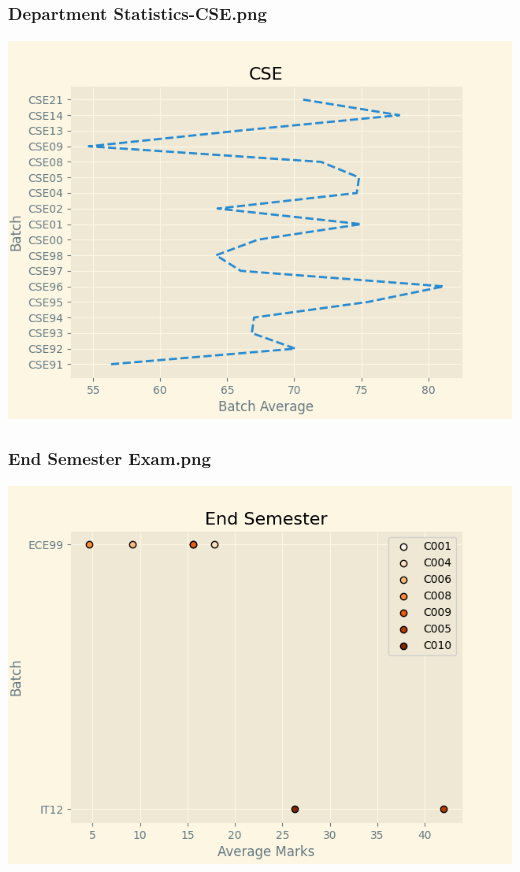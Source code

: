 \documentclass{article}
\begin{document}
\begin{center}
		\subsubsection*{Department Statistics-CSE.png}
		\includegraphics{outputs/Department Statistics-CSE.png}
		\subsubsection*{End Semester Exam.png}
		\includegraphics{outputs/End Semester Exam.png}
	\end{center}
\end{document}
